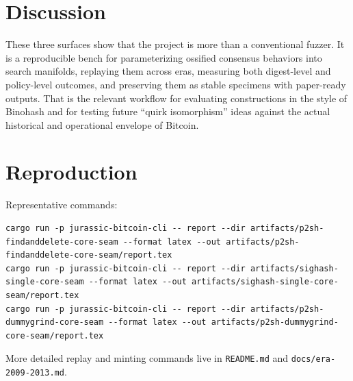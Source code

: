 \documentclass[11pt]{article}
\begin{document}
\section{Discussion}

These three surfaces show that the project is more than a conventional fuzzer. It is a reproducible bench for parameterizing ossified consensus behaviors into search manifolds, replaying them across eras, measuring both digest-level and policy-level outcomes, and preserving them as stable specimens with paper-ready outputs. That is the relevant workflow for evaluating constructions in the style of Binohash and for testing future ``quirk isomorphism'' ideas against the actual historical and operational envelope of Bitcoin.

\section*{Reproduction}

Representative commands:

\begin{verbatim}
cargo run -p jurassic-bitcoin-cli -- report --dir artifacts/p2sh-findanddelete-core-seam --format latex --out artifacts/p2sh-findanddelete-core-seam/report.tex
cargo run -p jurassic-bitcoin-cli -- report --dir artifacts/sighash-single-core-seam --format latex --out artifacts/sighash-single-core-seam/report.tex
cargo run -p jurassic-bitcoin-cli -- report --dir artifacts/p2sh-dummygrind-core-seam --format latex --out artifacts/p2sh-dummygrind-core-seam/report.tex
\end{verbatim}

More detailed replay and minting commands live in \texttt{README.md} and \texttt{docs/era-2009-2013.md}.
\end{document}
